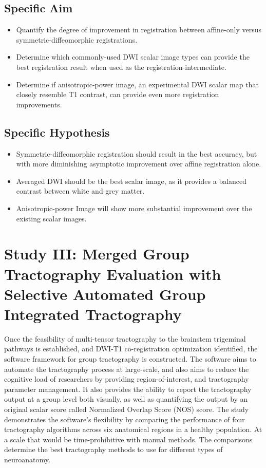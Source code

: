\subsection{Specific Aim}
\begin{itemize}
    \item Quantify the degree of improvement in registration between affine-only versus symmetric-diffeomorphic registrations.
    \item Determine which commonly-used DWI scalar image types can provide the best registration result when used as the registration-intermediate.
    \item Determine if anisotropic-power image, an experimental DWI scalar map that closely resemble T1 contrast, can provide even more registration improvements. 
\end{itemize}

\subsection{Specific Hypothesis}
\begin{itemize}
    \item Symmetric-diffeomorphic registration should result in the best accuracy, but with more diminishing asymptotic improvement over affine registration alone.
    \item Averaged DWI should be the best scalar image, as it provides a balanced contrast between white and grey matter.
    \item Anisotropic-power Image will show more substantial improvement over the existing scalar images.
\end{itemize}

\section{Study III: Merged Group Tractography Evaluation with Selective Automated Group Integrated Tractography}
Once the feasibility of multi-tensor tractography to the brainstem trigeminal pathways is established, and DWI-T1 co-registration optimization identified, the software framework for group tractography is constructed. The software aims to automate the tractography process at large-scale, and also aims to reduce the cognitive load of researchers by providing region-of-interest, and tractography parameter management. It also provides the ability to report the tractography output at a group level both visually, as well as quantifying the output by an original scalar score called Normalized Overlap Score (NOS) score. The study demonstrates the software's flexibility by comparing the performance of four tractography algorithms across six anatomical regions in a healthy population. At a scale that would be time-prohibitive with manual methods. The comparisons determine the best tractography methods to use for different types of neuroanatomy. 

